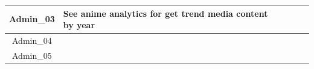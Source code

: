 \begin{table}[ht!]
\begin{tabularx}{\textwidth}{|c|>{\RaggedRight}p{2.2cm}|>{\RaggedRight}X|>{\RaggedRight}p{2.7cm}|>{\RaggedRight}p{1.98cm}|>{\RaggedRight}p{1.5cm}|}
        \hline
        Admin\_03 & See anime analytics for get trend media content by year &  &  &  &  \\
        \hline
        Admin\_04 &  &  &  &  &  \\
        \hline
        Admin\_05 &  &  &  &  &  \\
        \hline
    \end{tabularx}
\end{table}